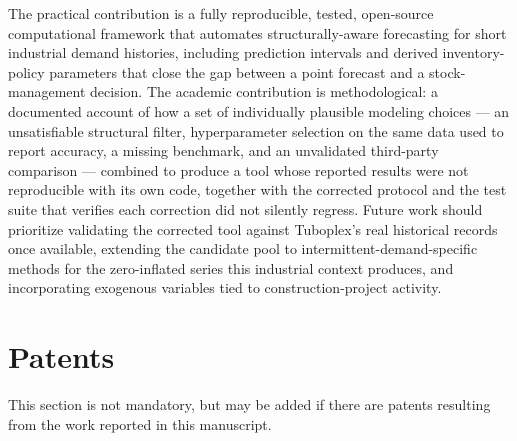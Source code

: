 \documentclass[forecasting,article,submit,pdftex,moreauthors]{Definitions/mdpi}
\begin{document}
The practical contribution is a fully reproducible, tested, open-source computational framework that automates structurally-aware forecasting for short industrial demand histories, including prediction intervals and derived inventory-policy parameters that close the gap between a point forecast and a stock-management decision. The academic contribution is methodological: a documented account of how a set of individually plausible modeling choices --- an unsatisfiable structural filter, hyperparameter selection on the same data used to report accuracy, a missing benchmark, and an unvalidated third-party comparison --- combined to produce a tool whose reported results were not reproducible with its own code, together with the corrected protocol and the test suite that verifies each correction did not silently regress. Future work should prioritize validating the corrected tool against Tuboplex's real historical records once available, extending the candidate pool to intermittent-demand-specific methods for the zero-inflated series this industrial context produces, and incorporating exogenous variables tied to construction-project activity.

\section{Patents}

This section is not mandatory, but may be added if there are patents resulting from the work reported in this manuscript.

\vspace{6pt} 



\end{document}
